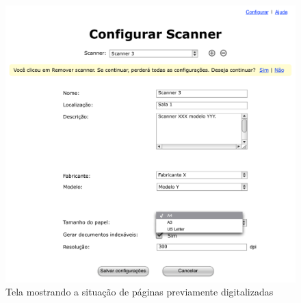 \begin{figure}[h]
 \centering
  \includegraphics[scale=0.6]{img/mockups/config-2.pdf}
  \caption {Tela mostrando a situação de páginas previamente digitalizadas}
  \label{fig:config_2}
\end{figure}
